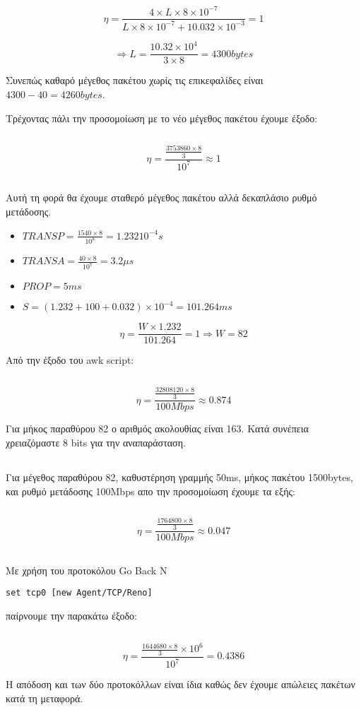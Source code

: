 \documentclass[a4paper,9pt]{article}
\begin{document}
\[\eta=\frac{4 \times
L\times8\times10^{-7}}{L\times8\times10^{-7}+10.032\times10^{-3} } = 1\]

\[ \Rightarrow L = \frac{10.32\times10^4}{3\times8} = 4300bytes\]

Συνεπώς καθαρό μέγεθος πακέτου χωρίς τις επικεφαλίδες είναι
$4300-40=4260bytes$.

Τρέχοντας πάλι την προσομοίωση με το νέο μέγεθος πακέτου έχουμε έξοδο:

\inputminted[fontsize=\footnotesize,linenos,frame=leftline]{text}{files/awk_2.out}

\[\eta=\frac{\frac{3753860 \times 8}{3}}{10^7} \approx 1 \]

\subsection{}
Αυτή τη φορά θα έχουμε σταθερό μέγεθος πακέτου αλλά δεκαπλάσιο ρυθμό
μετάδοσης.

\begin{itemize}
    \item $TRANSP = \frac{1540 \times 8}{10^8} = 1.232 10^{-4} s$
    \item $TRANSA = \frac{40 \times 8}{10^7} = 3.2 \mu s$
    \item $PROP = 5 ms$
    \item $S = (1.232 + 100 + 0.032) \times 10^{-4} = 101.264 ms$
\end{itemize}

\[\eta=\frac{W \times 1.232}{101.264} = 1 \Rightarrow W = 82\]

Από την έξοδο του awk script:
\inputminted[fontsize=\footnotesize,linenos,frame=leftline]{text}{files/awk_3.out}
\[\eta=\frac{\frac{32808120 \times 8}{3}}{100Mbps} \approx 0.874\]

Για μήκος παραθύρου 82 ο αριθμός ακολουθίας είναι 163. Κατά συνέπεια
χρειαζόμαστε 8 bits για την αναπαράσταση.

\subsection{}
Για μέγεθος παραθύρου 82, καθυστέρηση γραμμής 50ms, μήκος πακέτου 1500bytes,
και ρυθμό μετάδοσης 100Mbps απο την προσομοίωση έχουμε τα εξής:
\inputminted[fontsize=\footnotesize,linenos,frame=leftline]{text}{files/awk_4.out}

\[\eta=\frac{\frac{1764800 \times 8}{3}}{100Mbps} \approx 0.047\]

\subsection{}
Με χρήση του προτοκόλου Go Back N 
\begin{verbatim}
set tcp0 [new Agent/TCP/Reno]
\end{verbatim}
παίρνουμε την παρακάτω έξοδο:
\inputminted[fontsize=\footnotesize,linenos,frame=leftline]{text}{files/awk_5.out}

\[\eta=\frac{\frac{1644680 \times 8}{3} \times 10^6}{10^7} = 0.4386 \]

Η απόδοση και των δύο προτοκόλλων είναι ίδια καθώς δεν έχουμε απώλειες πακέτων
κατά τη μεταφορά.
\end{document}
